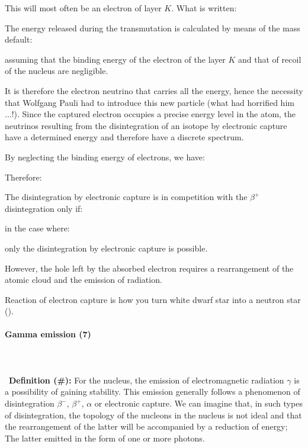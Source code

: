 	This will most often be an electron of layer $K$. What is written:
	
	The energy released during the transmutation is calculated by means of the mass default:
	
	assuming that the binding energy of the electron of the layer $K$ and that of recoil of the nucleus are negligible.
	
	It is therefore the electron neutrino that carries all the energy, hence the necessity that Wolfgang Pauli had to introduce this new particle (what had horrified him ...!). Since the captured electron occupies a precise energy level in the atom, the neutrinos resulting from the disintegration of an isotope by electronic capture have a determined energy and therefore have a discrete spectrum.
	
	By neglecting the binding energy of electrons, we have:
	
	Therefore:
	
	The disintegration by electronic capture is in competition with the $\beta^{+}$ disintegration only if:
	
	in the case where:
	
	only the disintegration by electronic capture is possible.

	However, the hole left by the absorbed electron requires a rearrangement of the atomic cloud and the emission of radiation.
	
	\begin{tcolorbox}[title=Remark,colframe=black,arc=10pt]
	Reaction of electron capture is how you turn white dwarf star into a neutron star ().
	\end{tcolorbox}
	
	\paragraph{Gamma emission (7)}\mbox{}\\\\\
	\textbf{Definition (\#\mydef):} For the nucleus, the emission of electromagnetic radiation $\gamma$ is a possibility of gaining stability. This emission generally follows a phenomenon of disintegration $\beta^{-}$, $\beta^{+}$, $\alpha$ or electronic capture. We can imagine that, in such types of disintegration, the topology of the nucleons in the nucleus is not ideal and that the rearrangement of the latter will be accompanied by a reduction of energy; The latter emitted in the form of one or more photons.

